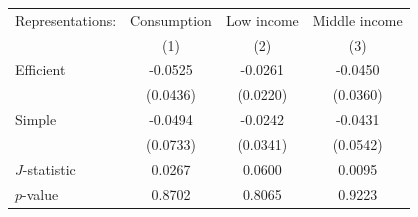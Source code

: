\begin{threeparttable}
\begin{tabular}{l | ccc}
\toprule
Representations: & \multicolumn{1}{c}{Consumption} & \multicolumn{1}{c}{Low income} & \multicolumn{1}{c}{Middle income} \\
& (1) & (2) & (3) \\
\midrule
  Efficient & -0.0525 & -0.0261 & -0.0450 \\
           & (0.0436) & (0.0220) & (0.0360) \\
\addlinespace[0.3em]
  Simple & -0.0494 & -0.0242 & -0.0431 \\
           & (0.0733) & (0.0341) & (0.0542) \\
\midrule
  $J$-statistic & 0.0267 & 0.0600 & 0.0095 \\
  $p$-value     & 0.8702 & 0.8065 & 0.9223 \\
\bottomrule
\end{tabular}
\end{threeparttable}
